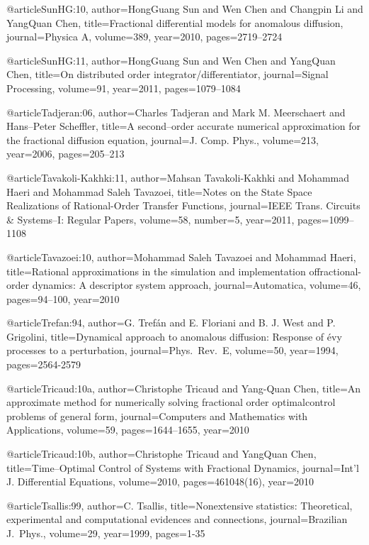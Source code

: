 \begin{thebibliography}{99}
@article{SunHG:10,
  author={HongGuang Sun and Wen Chen and Changpin Li and Yang{Q}uan Chen},
  title={Fractional differential models for anomalous diffusion},
  journal={Physica A},
  volume={389},
  year={2010},
  pages={2719--2724}
}

@article{SunHG:11,
  author={HongGuang Sun and Wen Chen and Yang{Q}uan Chen},
  title={On distributed order integrator/differentiator},
  journal={Signal Processing},
  volume={91},
  year={2011},
  pages={1079--1084}
}

@article{Tadjeran:06,
  author={Charles Tadjeran and Mark M. Meerschaert and Hans--Peter Scheffler},
  title={A second--order accurate numerical approximation for the fractional diffusion
    equation},
  journal={J. Comp. Phys.},
  volume={213},
  year={2006},
  pages={205--213}
}

@article{Tavakoli-Kakhki:11,
  author={Mahsan Tavakoli-Kakhki and Mohammad Haeri and Mohammad Saleh Tavazoei},
  title={Notes on the State Space Realizations of Rational-Order Transfer Functions},
  journal={IEEE Trans. Circuits {\&} Systems--I: Regular Papers},
  volume={58},
  number={5},
  year={2011},
  pages={1099--1108}
}

@article{Tavazoei:10,
  author={Mohammad Saleh Tavazoei and Mohammad Haeri},
  title={Rational approximations in the simulation and implementation offractional-order
    dynamics: A descriptor system approach},
  journal={Automatica},
  volume={46},
  pages={94--100},
  year={2010}
}

@article{Trefan:94,
  author={G. Tref\'an and E. Floriani and B. J. West and P. Grigolini},
  title={Dynamical approach to anomalous diffusion: Response of \'evy
    processes to a perturbation},
  journal={Phys.\ Rev.\ E},
  volume={50},
  year={1994},
  pages={2564-2579}
}

@article{Tricaud:10a,
  author={Christophe Tricaud and Yang-Quan Chen},
  title={An approximate method for numerically solving fractional order optimalcontrol
    problems of general form},
  journal={Computers and Mathematics with Applications},
  volume={59},
  pages={1644--1655},
  year={2010}
}

@article{Tricaud:10b,
  author={Christophe Tricaud and Yang{Q}uan Chen},
  title={Time--Optimal Control of Systems with Fractional Dynamics},
  journal={Int'l J. Differential Equations},
  volume={2010},
  pages={461048(16)},
  year={2010}
}

@article{Tsallis:99,
  author={C. Tsallis},
  title={Nonextensive statistics: Theoretical, experimental and computational evidences
    and connections},
  journal={Brazilian J.\ Phys.},
  volume={29},
  year={1999},
  pages={1-35}
}


\end{thebibliography}
